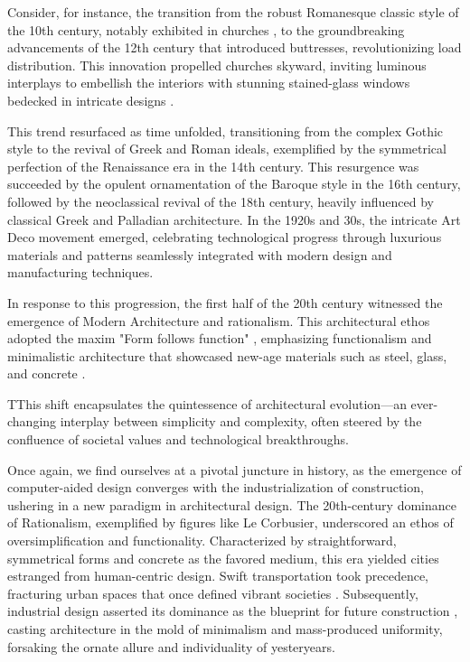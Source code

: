 Consider, for instance, the transition from the robust Romanesque classic style of the 10th century, notably exhibited in churches \cite{Arora2023}, to the groundbreaking advancements of the 12th century that introduced buttresses, revolutionizing load distribution. This innovation propelled churches skyward, inviting luminous interplays to embellish the interiors with stunning stained-glass windows bedecked in intricate designs \cite{Stacbond2020}.

This trend resurfaced as time unfolded, transitioning from the complex Gothic style to the revival of Greek and Roman ideals, exemplified by the symmetrical perfection of the Renaissance era in the 14th century. This resurgence was succeeded by the opulent ornamentation of the Baroque style in the 16th century, followed by the neoclassical revival of the 18th century, heavily influenced by classical Greek and Palladian architecture. In the 1920s and 30s, the intricate Art Deco movement emerged, celebrating technological progress through luxurious materials and patterns seamlessly integrated with modern design and manufacturing techniques.

In response to this progression, the first half of the 20th century witnessed the emergence of Modern Architecture and rationalism. This architectural ethos adopted the maxim "Form follows function" \cite{Gage2015}, emphasizing functionalism and minimalistic architecture that showcased new-age materials such as steel, glass, and concrete \cite{Arora2023}.

TThis shift encapsulates the quintessence of architectural evolution—an ever-changing interplay between simplicity and complexity, often steered by the confluence of societal values and technological breakthroughs.

Once again, we find ourselves at a pivotal juncture in history, as the emergence of computer-aided design converges with the industrialization of construction, ushering in a new paradigm in architectural design. The 20th-century dominance of Rationalism, exemplified by figures like Le Corbusier, underscored an ethos of oversimplification and functionality. Characterized by straightforward, symmetrical forms and concrete as the favored medium, this era yielded cities estranged from human-centric design. Swift transportation took precedence, fracturing urban spaces that once defined vibrant societies \cite{Stacbond2020}. Subsequently, industrial design asserted its dominance as the blueprint for future construction \cite{Economakis2023}, casting architecture in the mold of minimalism and mass-produced uniformity, forsaking the ornate allure and individuality of yesteryears.

